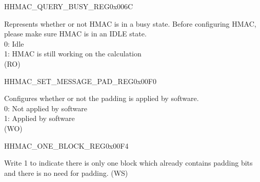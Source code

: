     \begin{register}{H}{HMAC\_QUERY\_BUSY\_REG}{0x006C}\label{regdesc:HMACQUERYBUSYREG}
    \regnewline%
    \begin{regdesc}\begin{reglist}
    \label{fielddesc:HMACBUSYSTATE}\item [HMAC\_BUSY\_STATE] Represents whether or not HMAC is in a busy state. Before configuring HMAC, please make sure HMAC is in an IDLE state.
    \\0: Idle
    \\1: HMAC is still working on the calculation
    \\(RO)
    \end{reglist}\end{regdesc}
    \end{register}


    \begin{register}{H}{HMAC\_SET\_MESSAGE\_PAD\_REG}{0x00F0}\label{regdesc:HMACSETMESSAGEPADREG}
    \regnewline%
    \begin{regdesc}\begin{reglist}
    \label{fielddesc:HMACSETTEXTPAD}\item [HMAC\_SET\_TEXT\_PAD] Configures whether or not the padding is applied by software.
    \\0: Not applied by software
    \\1: Applied by software
    \\(WO)
    \end{reglist}\end{regdesc}
    \end{register}


    \begin{register}{H}{HMAC\_ONE\_BLOCK\_REG}{0x00F4}\label{regdesc:HMACONEBLOCKREG}
    \regnewline%
    \begin{regdesc}\begin{reglist}
    \label{fielddesc:HMACSETONEBLOCK}\item [HMAC\_SET\_ONE\_BLOCK] Write 1 to indicate there is only one block which already contains padding bits and there is no need for padding. (WS)
    \end{reglist}\end{regdesc}
    \end{register}



